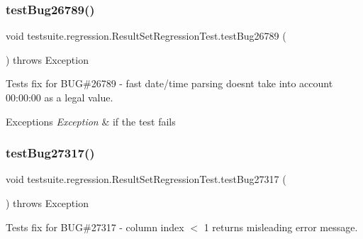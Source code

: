 \subsubsection{\texorpdfstring{test\+Bug26789()}{testBug26789()}}
{\footnotesize\ttfamily void testsuite.\+regression.\+Result\+Set\+Regression\+Test.\+test\+Bug26789 (\begin{DoxyParamCaption}{ }\end{DoxyParamCaption}) throws Exception}

Tests fix for B\+UG\#26789 -\/ fast date/time parsing doesn\textquotesingle{}t take into account 00\+:00\+:00 as a legal value.


\begin{DoxyExceptions}{Exceptions}
{\em Exception} & if the test fails \\
\hline
\end{DoxyExceptions}
\mbox{\label{classtestsuite_1_1regression_1_1_result_set_regression_test_af045c2d205dada239fec239d477c2563}} 
\subsubsection{\texorpdfstring{test\+Bug27317()}{testBug27317()}}
{\footnotesize\ttfamily void testsuite.\+regression.\+Result\+Set\+Regression\+Test.\+test\+Bug27317 (\begin{DoxyParamCaption}{ }\end{DoxyParamCaption}) throws Exception}

Tests fix for B\+UG\#27317 -\/ column index $<$ 1 returns misleading error message.


